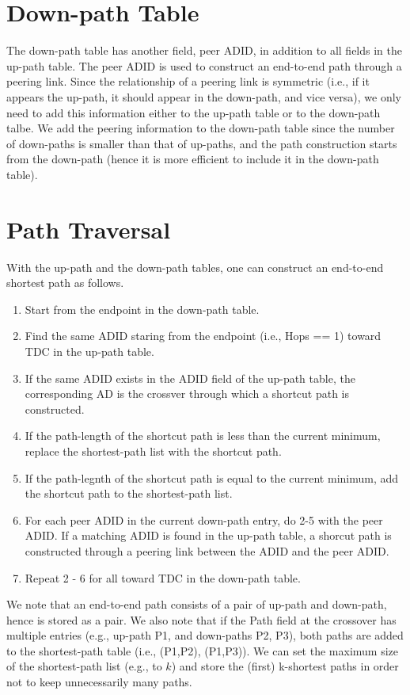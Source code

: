 \section{Down-path Table}
The down-path table has another field, peer ADID, in addition to all fields in the up-path table. The peer ADID is used to construct an end-to-end path through a peering link. Since the relationship of a peering link is symmetric (i.e., if it appears the up-path, it should appear in the down-path, and vice versa), we only need to add this information either to the up-path table or to the down-path talbe. We add the peering information to the down-path table since the number of down-paths is smaller than that of up-paths, and the path construction starts from the down-path (hence it is more efficient to include it in the down-path table).

\section{Path Traversal}
With the up-path and the down-path tables, one can construct an end-to-end shortest path as follows.
\begin{enumerate}
\item Start from the endpoint \AD in the down-path table.
\item Find the same ADID staring from the endpoint (i.e., Hops == 1) \AD toward TDC \AD in the up-path table.
\item If the same ADID exists in the ADID field of the up-path table, the corresponding AD is the crossver \AD through which a shortcut path is constructed.
\item If the path-length of the shortcut path is less than the current minimum, replace the shortest-path list with the shortcut path.
\item If the path-legnth of the shortcut path is equal to the current minimum, add the shortcut path to the shortest-path list.
\item For each peer ADID in the current down-path entry, do 2-5 with the peer ADID. If a matching ADID is found in the up-path table, a shorcut path is constructed through a peering link between the ADID and the peer ADID.
\item Repeat 2 - 6 for all \ADs toward TDC \AD in the down-path table. 
\end{enumerate}

We note that an end-to-end path consists of a pair of up-path and down-path, hence is stored as a pair. We also note that if the Path field at the crossover \AD has multiple entries (e.g., up-path P1, and down-paths P2, P3), both paths are added to the shortest-path table (i.e., (P1,P2), (P1,P3)). We can set the maximum size of the shortest-path list (e.g., to $k$) and store the (first) k-shortest paths in order not to keep unnecessarily many paths.


